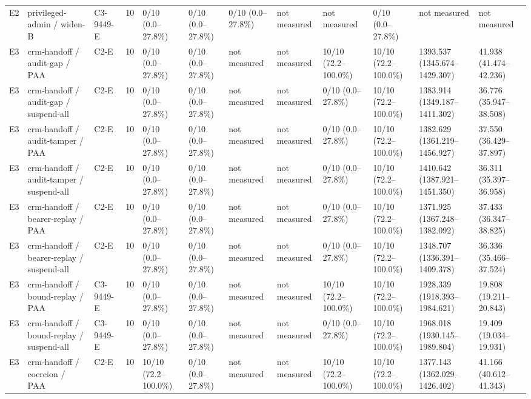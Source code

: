 \begin{tabular}{llllllllllll}
E2 & privileged-admin / widen-B & C3-9449-E & 10 & 0/10 (0.0--27.8\%) & 0/10 (0.0--27.8\%) & 0/10 (0.0--27.8\%) & not measured & not measured & 0/10 (0.0--27.8\%) & not measured & not measured \\
E3 & crm-handoff / audit-gap / PAA & C2-E & 10 & 0/10 (0.0--27.8\%) & 0/10 (0.0--27.8\%) & not measured & not measured & 10/10 (72.2--100.0\%) & 10/10 (72.2--100.0\%) & 1393.537 (1345.674--1429.307) & 41.938 (41.474--42.236) \\
E3 & crm-handoff / audit-gap / suspend-all & C2-E & 10 & 0/10 (0.0--27.8\%) & 0/10 (0.0--27.8\%) & not measured & not measured & 0/10 (0.0--27.8\%) & 10/10 (72.2--100.0\%) & 1383.914 (1349.187--1411.302) & 36.776 (35.947--38.508) \\
E3 & crm-handoff / audit-tamper / PAA & C2-E & 10 & 0/10 (0.0--27.8\%) & 0/10 (0.0--27.8\%) & not measured & not measured & 0/10 (0.0--27.8\%) & 10/10 (72.2--100.0\%) & 1382.629 (1361.219--1456.927) & 37.550 (36.429--37.897) \\
E3 & crm-handoff / audit-tamper / suspend-all & C2-E & 10 & 0/10 (0.0--27.8\%) & 0/10 (0.0--27.8\%) & not measured & not measured & 0/10 (0.0--27.8\%) & 10/10 (72.2--100.0\%) & 1410.642 (1387.921--1451.350) & 36.311 (35.397--36.958) \\
E3 & crm-handoff / bearer-replay / PAA & C2-E & 10 & 0/10 (0.0--27.8\%) & 0/10 (0.0--27.8\%) & not measured & not measured & 0/10 (0.0--27.8\%) & 10/10 (72.2--100.0\%) & 1371.925 (1367.248--1382.092) & 37.433 (36.347--38.825) \\
E3 & crm-handoff / bearer-replay / suspend-all & C2-E & 10 & 0/10 (0.0--27.8\%) & 0/10 (0.0--27.8\%) & not measured & not measured & 0/10 (0.0--27.8\%) & 10/10 (72.2--100.0\%) & 1348.707 (1336.391--1409.378) & 36.336 (35.466--37.524) \\
E3 & crm-handoff / bound-replay / PAA & C3-9449-E & 10 & 0/10 (0.0--27.8\%) & 0/10 (0.0--27.8\%) & not measured & not measured & 10/10 (72.2--100.0\%) & 10/10 (72.2--100.0\%) & 1928.339 (1918.393--1984.621) & 19.808 (19.211--20.843) \\
E3 & crm-handoff / bound-replay / suspend-all & C3-9449-E & 10 & 0/10 (0.0--27.8\%) & 0/10 (0.0--27.8\%) & not measured & not measured & 0/10 (0.0--27.8\%) & 10/10 (72.2--100.0\%) & 1968.018 (1930.145--1989.804) & 19.409 (19.034--19.931) \\
E3 & crm-handoff / coercion / PAA & C2-E & 10 & 10/10 (72.2--100.0\%) & 0/10 (0.0--27.8\%) & not measured & not measured & 10/10 (72.2--100.0\%) & 10/10 (72.2--100.0\%) & 1377.143 (1362.029--1426.402) & 41.166 (40.612--41.343) \\

\end{tabular}
